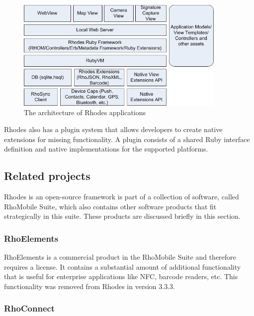 \begin{figure}[h]
    \begin{center}
        \includegraphics[width=0.9\textwidth]{figs/rhodes-architecture.png}
        \caption{The architecture of Rhodes applications}
        \label{fig:rhodes-architecture}
    \end{center}
\end{figure}

Rhodes also has a plugin system that allows developers to create native extensions for missing functionality. A plugin consists of a shared Ruby interface definition and native implementations for the supported platforms.

\subsection{Related projects}

Rhodes is an open-source framework is part of a collection of software, called RhoMobile Suite, which also contains other software products that fit strategically in this suite. These products are discussed briefly in this section.

\subsubsection{RhoElements}

RhoElements is a commercial product in the RhoMobile Suite and therefore requires a license. It contains a substantial amount of additional functionality that is useful for enterprise applications like NFC, barcode readers, etc. This functionality was removed from Rhodes in version 3.3.3.

\subsubsection{RhoConnect}

